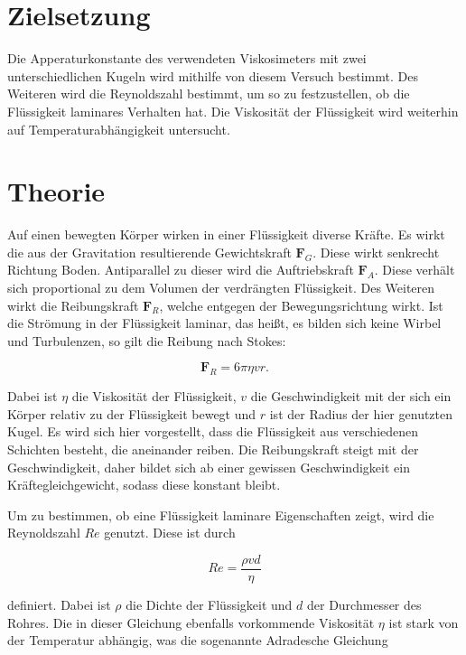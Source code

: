 \section{Zielsetzung}

Die Apperaturkonstante des verwendeten Viskosimeters mit zwei unterschiedlichen Kugeln wird mithilfe von diesem Versuch bestimmt.
Des Weiteren wird die Reynoldszahl bestimmt, um so zu festzustellen, ob die Flüssigkeit laminares Verhalten hat. 
Die Viskosität der Flüssigkeit wird weiterhin auf Temperaturabhängigkeit untersucht.

\section{Theorie}
\label{sec:Theorie}

Auf einen bewegten Körper wirken in einer Flüssigkeit diverse Kräfte. Es wirkt die aus der Gravitation resultierende Gewichtskraft $\symbf{F}_G$. Diese wirkt senkrecht Richtung Boden.
Antiparallel zu dieser wird die Auftriebskraft $\symbf{F}_A$. Diese verhält sich proportional zu dem Volumen der verdrängten Flüssigkeit.
Des Weiteren wirkt die Reibungskraft $\symbf{F}_R$, welche entgegen der Bewegungsrichtung wirkt.
Ist die Strömung in der Flüssigkeit laminar, das heißt, es bilden sich keine Wirbel und Turbulenzen, so gilt die Reibung nach Stokes:

\begin{equation}
\label{eqn:stokes}
    \symbf{F}_R = 6 \pi \eta v r .
\end{equation}

Dabei ist $\eta$ die Viskosität der Flüssigkeit, $v$ die Geschwindigkeit mit der sich ein Körper relativ zu der Flüssigkeit bewegt und $r$ ist der Radius der hier genutzten Kugel.
Es wird sich hier vorgestellt, dass die Flüssigkeit aus verschiedenen Schichten besteht, die aneinander reiben.
Die Reibungskraft steigt mit der Geschwindigkeit, daher bildet sich ab einer gewissen Geschwindigkeit ein Kräftegleichgewicht, sodass diese konstant bleibt.

Um zu bestimmen, ob eine Flüssigkeit laminare Eigenschaften zeigt, wird die Reynoldszahl $Re$ genutzt. Diese ist durch

\begin{equation}
\label{eqn:reynold}
    Re = \frac{\rho v d}{\eta}
\end{equation}

definiert. Dabei ist $\rho$ die Dichte der Flüssigkeit und $d$ der Durchmesser des Rohres. 
Die in dieser Gleichung ebenfalls vorkommende Viskosität $\eta$ ist stark von der Temperatur abhängig, was die sogenannte Adradesche Gleichung


